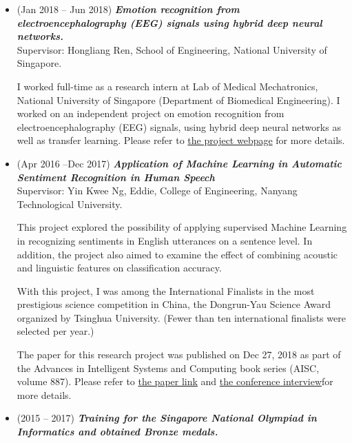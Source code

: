 \documentclass[11pt,reqno,oneside,a4paper]{article}
\begin{document}
\begin{itemize}
		\item (Jan 2018 -- Jun 2018)   \emph{\textbf{Emotion recognition from electroencephalography (EEG) signals using hybrid deep neural networks.}} \\
		 \hspace{0.2in} Supervisor: Hongliang Ren, School of Engineering, National University of Singapore.
		 
		 \par I worked full-time as a research intern at Lab of Medical Mechatronics, National University of Singapore (Department of Biomedical Engineering). I worked on an independent project on emotion recognition from electroencephalography (EEG) signals, using hybrid deep neural networks as well as transfer learning. Please refer to \href{https://sites.google.com/view/liu-zhang/home}{the project webpage} for more details.
		 
		
		\item (Apr 2016 --Dec 2017) \emph{\textbf{Application of Machine Learning in Automatic Sentiment Recognition in Human Speech}} \\
		 \hspace{0.2in}Supervisor: Yin Kwee Ng, Eddie, College of Engineering, Nanyang Technological University.
		 
		 \par  This project explored the possibility of applying supervised Machine Learning in recognizing sentiments in English utterances on a sentence level. In addition, the project also aimed to examine the effect of combining acoustic and linguistic features on classification accuracy. 
		 
		 \par With this project, I was among the International Finalists in the most prestigious science competition in China, the Dongrun-Yau Science Award organized by Tsinghua University. (Fewer than ten international finalists were selected per year.)
		 
		 \par The paper for this research project was published on Dec 27, 2018 as part of the Advances in Intelligent Systems and Computing book series (AISC, volume 887). Please refer to \href{https://link.springer.com/chapter/10.1007/978-3-030-03405-4_41}{the paper link} and \href{https://www.youtube.com/watch?v=fwrFHwDvMnU&list=PLS161HmXR6JjDQjE-lja23OKrbkJeO0vW&index=16}{the conference interview}for more details.
		 
		 \item (2015 -- 2017) \emph{\textbf{Training for the Singapore National Olympiad in Informatics and obtained Bronze medals.}}
		 

\end{itemize}
\end{document}
